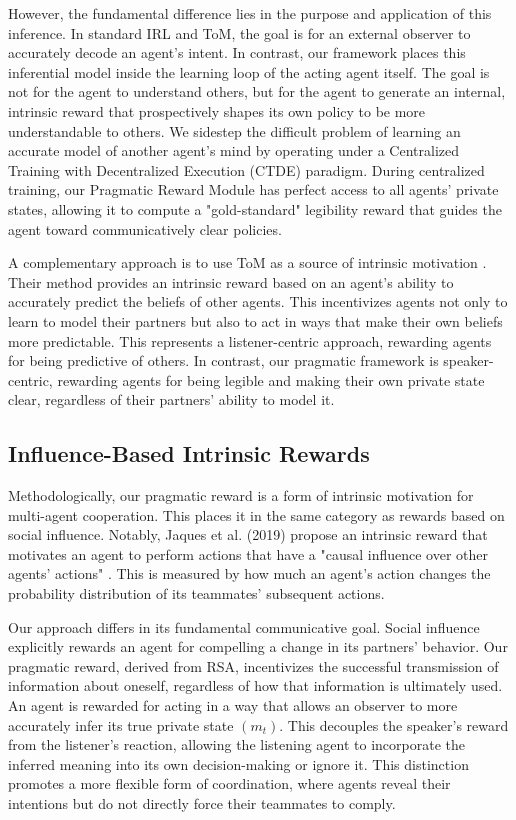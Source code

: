 \documentclass{article}
\begin{document}
However, the fundamental difference lies in the purpose and application of this inference. In standard IRL and ToM, the goal is for an external observer to accurately decode an agent's intent. In contrast, our framework places this inferential model inside the learning loop of the acting agent itself. The goal is not for the agent to understand others, but for the agent to generate an internal, intrinsic reward that prospectively shapes its own policy to be more understandable to others. We sidestep the difficult problem of learning an accurate model of another agent's mind by operating under a Centralized Training with Decentralized Execution (CTDE) paradigm. During centralized training, our Pragmatic Reward Module has perfect access to all agents' private states, allowing it to compute a "gold-standard" legibility reward that guides the agent toward communicatively clear policies.

A complementary approach is to use ToM as a source of intrinsic motivation \cite{oguntola2023tom}. Their method provides an intrinsic reward based on an agent's ability to accurately predict the beliefs of other agents. This incentivizes agents not only to learn to model their partners but also to act in ways that make their own beliefs more predictable. This represents a listener-centric approach, rewarding agents for being predictive of others. In contrast, our pragmatic framework is speaker-centric, rewarding agents for being legible and making their own private state clear, regardless of their partners' ability to model it.

\subsection{Influence-Based Intrinsic Rewards}

Methodologically, our pragmatic reward is a form of intrinsic motivation for multi-agent cooperation. This places it in the same category as rewards based on social influence. Notably, Jaques et al. (2019) propose an intrinsic reward that motivates an agent to perform actions that have a "causal influence over other agents' actions" \cite{socialinfluence2019}. This is measured by how much an agent's action changes the probability distribution of its teammates' subsequent actions.

Our approach differs in its fundamental communicative goal. Social influence explicitly rewards an agent for compelling a change in its partners' behavior. Our pragmatic reward, derived from RSA, incentivizes the successful transmission of information about oneself, regardless of how that information is ultimately used. An agent is rewarded for acting in a way that allows an observer to more accurately infer its true private state $(m_t)$. This decouples the speaker's reward from the listener's reaction, allowing the listening agent to incorporate the inferred meaning into its own decision-making or ignore it. This distinction promotes a more flexible form of coordination, where agents reveal their intentions but do not directly force their teammates to comply.
\end{document}
